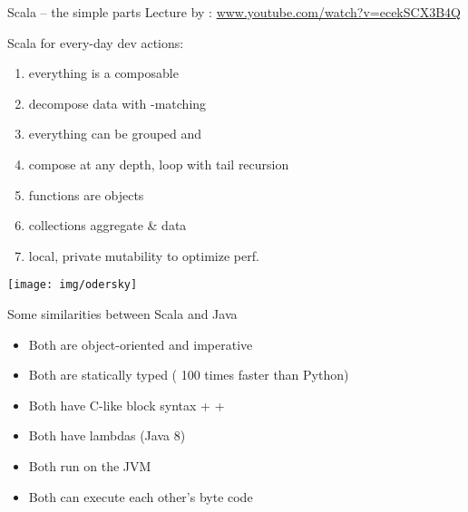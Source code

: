 \documentclass{lecturenotes}
\begin{document}
\begin{Slide}{Scala -- the simple parts}
\fontsize{9}{11}\selectfont
Lecture by : \href{https://www.youtube.com/watch?v=ecekSCX3B4Q}{www.youtube.com/watch?v=ecekSCX3B4Q}

\begin{multicols}{2}
\fontsize{9}{11}\selectfont
Scala for every-day dev actions:

\begin{enumerate}
\item {} everything is a composable 
\item {} decompose data with -matching
\item {} everything can be grouped and 
\item {} compose at any depth, loop with tail recursion
\item {} functions are objects
\item {} collections aggregate \&  data
\item {} local, private mutability to optimize perf.
\end{enumerate}

\columnbreak

\texttt{[image: img/odersky]}

\end{multicols}
\end{Slide}

\begin{Slide}{Some similarities between Scala and Java}
\begin{itemize}
\item Both are object-oriented and imperative
\item Both are statically typed (\code{~} 100 times faster than Python)
\item Both have C-like block syntax \code+{ }+
\item Both have lambdas (Java 8)
\item Both run on the JVM
\item Both can execute each other's byte code
\end{itemize}
\end{Slide}
\end{document}

